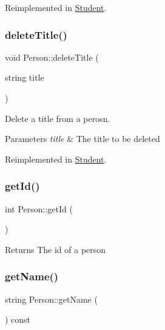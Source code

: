 Reimplemented in \hyperlink{class_student_a616e34f2eebf885b3419bcd27e8f3840}{Student}.

\mbox{\label{class_person_a14f687637476ef033a3c9b865e67fd69}} 
\subsubsection{\texorpdfstring{delete\+Title()}{deleteTitle()}}
{\footnotesize\ttfamily void Person\+::delete\+Title (\begin{DoxyParamCaption}\item[{string}]{title }\end{DoxyParamCaption})\hspace{0.3cm}{\ttfamily [virtual]}}



Delete a title from a perosn. 


\begin{DoxyParams}{Parameters}
{\em title} & The title to be deleted \\
\hline
\end{DoxyParams}


Reimplemented in \hyperlink{class_student_a16d2a2c6abe8aa9ce53a2a15c4656eee}{Student}.

\mbox{\label{class_person_afd0359228a09c4adcffe31f456046717}} 
\subsubsection{\texorpdfstring{get\+Id()}{getId()}}
{\footnotesize\ttfamily int Person\+::get\+Id (\begin{DoxyParamCaption}{ }\end{DoxyParamCaption})}

\begin{DoxyReturn}{Returns}
The id of a person 
\end{DoxyReturn}
\mbox{\label{class_person_a9db2e2ccfc6cfa0d7979613ec2aaa922}} 
\subsubsection{\texorpdfstring{get\+Name()}{getName()}}
{\footnotesize\ttfamily string Person\+::get\+Name (\begin{DoxyParamCaption}{ }\end{DoxyParamCaption}) const}

